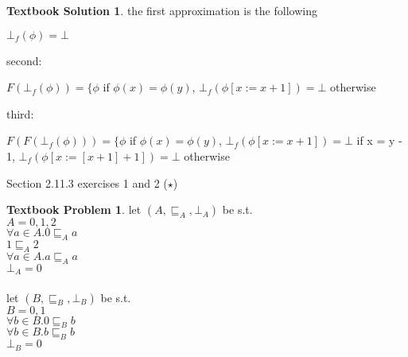 \documentclass[10pt]{article}
\theoremstyle{definition}
\newtheorem{bp}{Textbook Problem}
\newtheorem{ts}{Textbook Solution}
\begin{document}
  

  \begin{ts}

  the first approximation is the following

  

  $\bot_f (\phi) = \bot$

  

  second:

  

  $F(\bot_f (\phi)) = \{ \phi$ if $\phi(x) = \phi(y)$, $\bot_f(\phi[x := x + 1]) = \bot$ otherwise

  

  third:

  

  $F(F(\bot_f (\phi))) = \{ \phi$ if $\phi(x) = \phi(y)$, $\bot_f(\phi[x := x + 1]) = \bot$ if x = y - 1, $\bot_f(\phi[x := [x + 1] + 1]) = \bot$ otherwise

  

  

  

  \end{ts}

  

  

  

  Section 2.11.3 exercises 1 and 2 ($\star$)

  \begin{bp}

	let $(A, \sqsubseteq_A,\bot_A)$ be s.t. \\
	\indent $A = {0,1,2}$ \\ 
	$\forall a \in A. 0 \sqsubseteq_A a$ \\
	$1 \sqsubseteq_A 2$ \\
	$\forall a \in A. a \sqsubseteq_A a$ \\
	$\bot_A = 0$ \\ \\
	
	let $(B, \sqsubseteq_B,\bot_B)$ be s.t. \\
	\indent $B = {0,1}$ \\ 
	$\forall b \in B. 0 \sqsubseteq_B b$ \\
	$\forall b \in B. b \sqsubseteq_B b$ \\
	$\bot_B = 0$
  
  \end{bp}
  
\end{document}

